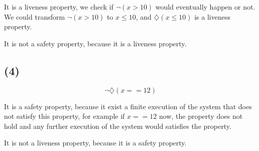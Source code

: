 \documentclass[a4paper,11pt]{report}
\newcommand*{\D}{\diamondsuit} %
\begin{document}
It is a liveness property, we check if $\neg(x > 10)$ would eventually happen or
not. We could transform $\neg(x > 10)$ to $x \leq 10$, and $\D (x \leq 10)$ is a
liveness property.

It is not a safety property, because it is a liveness property.

\subsection*{(4)}
\[
  \neg\D(x == 12)
\]

It is a safety property, because it exist a finite execution of the system that
does not satisfy this property, for example if $x==12$ now, the property does
not hold and any further execution of the system would satisfies the property.

It is not a liveness property, because it is a safety property.
\end{document}
